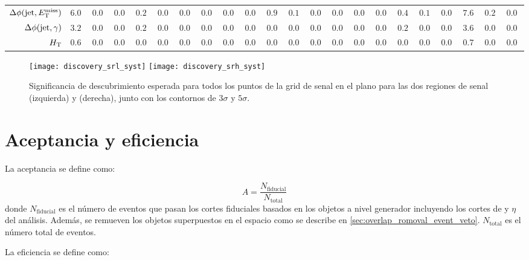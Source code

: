 \begin{table}
{\begin{tabular}{r|rrr|rrr|rrr|rrr|rrr|rrr|rrr}
       $\Delta \phi (\mathrm{jet},E_{\mathrm{T}}^{\mathrm{miss}})$         &   $6.01$ & $0.00$ & $0.00$ & $0.22$ & $0.01$ & $0.00$ &  $0.00$ &  $0.00$ &  $0.00$ &     $0.98$ &     $0.16$ & $0.00$ & $0.00$ & $0.00$ & $0.04$ &  $0.41$ &  $0.11$ & $0.00$ &     $7.62$ &     $0.28$ &  $0.04$ \\
       $\Delta \phi (\mathrm{jet},\gamma)$         &   $3.21$ & $0.00$ & $0.00$ & $0.22$ & $0.00$ & $0.00$ &  $0.00$ &  $0.00$ &  $0.00$ &     $0.00$ &     $0.00$ & $0.00$ & $0.00$ & $0.00$ & $0.00$ &  $0.25$ &  $0.04$ & $0.00$ &     $3.69$ &     $0.04$ &  $0.00$ \\
       $H_{\mathrm{T}}$             &   $0.66$ & $0.00$ & $0.00$ & $0.00$ & $0.00$ & $0.00$ &  $0.00$ &  $0.00$ &  $0.00$ &     $0.00$ &     $0.00$ & $0.00$ & $0.00$ & $0.00$ & $0.00$ &  $0.08$ &  $0.02$ & $0.00$ &     $0.74$ &     $0.02$ &  $0.00$ \\
       \hline
    \end{tabular}
  }
\end{table}



\begin{figure}[!htbp]
  \centering

  \texttt{[image: discovery\_srl\_syst]}
  \texttt{[image: discovery\_srh\_syst]}

  \caption{Significancia de descubrimiento esperada para todos los puntos de la grid de senal en el
    plano {\mgmn} para las dos regiones de senal {\SRL} (izquierda) y {\SRH} (derecha), junto
    con los contornos de $3\sigma$ y $5\sigma$.}

  \label{fig:opt_discovery_exp}
\end{figure}


\section{Aceptancia y eficiencia}

La aceptancia se define como:

\begin{equation}
  A = \frac{N_\mathrm{fiducial}}{N_\mathrm{total}}
\end{equation}
%
donde $N_\mathrm{fiducial}$ es el número de eventos que pasan los cortes
fiduciales basados en los objetos a nivel generador incluyendo los
cortes de {\pt} y $\eta$ del análisis. Además, se remueven los objetos
superpuestos en el espacio {\etaphi} como se describe en
\cref{sec:overlap_romoval_event_veto}. $N_\mathrm{total}$ es el número total
de eventos.

La eficiencia se define como:

